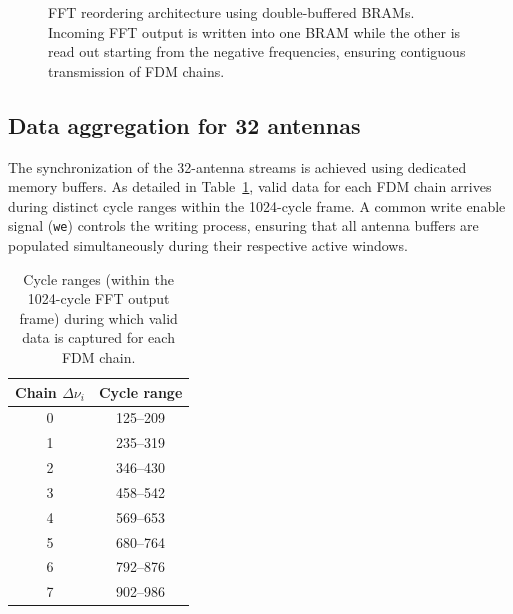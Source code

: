\begin{figure}[t]
    \caption[FFT reordering architecture]{FFT reordering architecture using double-buffered BRAMs. Incoming FFT output is written into one BRAM while the other is read out starting from the negative frequencies, ensuring contiguous transmission of FDM chains.}
    \label{fig:fft_reordering}
\end{figure}

\subsection{Data aggregation for 32 antennas}
The synchronization of the 32-antenna streams is achieved using dedicated memory buffers. As detailed in Table~\ref{tab:streaming_bands}, valid data for each FDM chain arrives during distinct cycle ranges within the 1024-cycle frame. A common write enable signal (\texttt{we}) controls the writing process, ensuring that all antenna buffers are populated simultaneously during their respective active windows.

\begin{table}[t]
\centering
\caption[Cycle ranges for FDM chain streaming]
{Cycle ranges (within the 1024-cycle FFT output frame) during which valid data is captured for each FDM chain.}
\begin{tabular}{cc}
\toprule
\textbf{Chain $\Delta\nu_i$} & \textbf{Cycle range} \\
\midrule
0 & 125--209  \\
1 & 235--319  \\
2 & 346--430   \\
3 & 458--542   \\
4 & 569--653   \\
5 & 680--764  \\
6 & 792--876 \\
7 & 902--986  \\
\bottomrule
\end{tabular}
\label{tab:streaming_bands}
\end{table}

